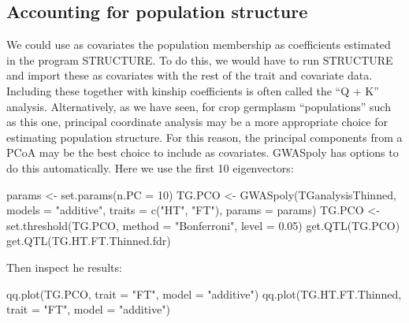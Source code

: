 \documentclass[
]{book}
\newenvironment{Shaded}{\begin{snugshade}}{\end{snugshade}}
\newcommand{\AttributeTok}[1]{\textcolor[rgb]{0.77,0.63,0.00}{#1}}
\newcommand{\DecValTok}[1]{\textcolor[rgb]{0.00,0.00,0.81}{#1}}
\newcommand{\FloatTok}[1]{\textcolor[rgb]{0.00,0.00,0.81}{#1}}
\newcommand{\FunctionTok}[1]{\textcolor[rgb]{0.00,0.00,0.00}{#1}}
\newcommand{\NormalTok}[1]{#1}
\newcommand{\OtherTok}[1]{\textcolor[rgb]{0.56,0.35,0.01}{#1}}
\newcommand{\StringTok}[1]{\textcolor[rgb]{0.31,0.60,0.02}{#1}}
\begin{document}
\hypertarget{accounting-for-population-structure}{%
\subsection{Accounting for population structure}\label{accounting-for-population-structure}}

We could use as covariates the population membership as coefficients estimated in the program STRUCTURE. To do this, we would have to run STRUCTURE and import these as covariates with the rest of the trait and covariate data. Including these together with kinship coefficients is often called the ``Q + K'' analysis. Alternatively, as we have seen, for crop germplasm ``populations'' such as this one, principal coordinate analysis may be a more appropriate choice for estimating population structure. For this reason, the principal components from a PCoA may be the best choice to include as covariates. GWASpoly has options to do this automatically. Here we use the first 10 eigenvectors:

\begin{Shaded}
\begin{Highlighting}[]
\NormalTok{params }\OtherTok{\textless{}{-}} \FunctionTok{set.params}\NormalTok{(}\AttributeTok{n.PC =} \DecValTok{10}\NormalTok{)}
\NormalTok{TG.PCO }\OtherTok{\textless{}{-}} \FunctionTok{GWASpoly}\NormalTok{(TGanalysisThinned, }\AttributeTok{models =} \StringTok{"additive"}\NormalTok{, }\AttributeTok{traits =} \FunctionTok{c}\NormalTok{(}\StringTok{"HT"}\NormalTok{, }
    \StringTok{"FT"}\NormalTok{), }\AttributeTok{params =}\NormalTok{ params)}
\NormalTok{TG.PCO }\OtherTok{\textless{}{-}} \FunctionTok{set.threshold}\NormalTok{(TG.PCO, }\AttributeTok{method =} \StringTok{"Bonferroni"}\NormalTok{, }\AttributeTok{level =} \FloatTok{0.05}\NormalTok{)}
\FunctionTok{get.QTL}\NormalTok{(TG.PCO)}
\FunctionTok{get.QTL}\NormalTok{(TG.HT.FT.Thinned.fdr)}
\end{Highlighting}
\end{Shaded}

Then inspect he results:

\begin{Shaded}
\begin{Highlighting}[]
\FunctionTok{qq.plot}\NormalTok{(TG.PCO, }\AttributeTok{trait =} \StringTok{"FT"}\NormalTok{, }\AttributeTok{model =} \StringTok{"additive"}\NormalTok{)}
\FunctionTok{qq.plot}\NormalTok{(TG.HT.FT.Thinned, }\AttributeTok{trait =} \StringTok{"FT"}\NormalTok{, }\AttributeTok{model =} \StringTok{"additive"}\NormalTok{)}
\end{Highlighting}
\end{Shaded}
\end{document}
